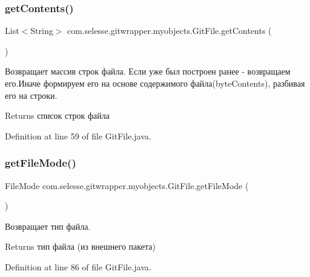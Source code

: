\subsubsection{\texorpdfstring{get\+Contents()}{getContents()}}
{\footnotesize\ttfamily List$<$String$>$ com.\+selesse.\+gitwrapper.\+myobjects.\+Git\+File.\+get\+Contents (\begin{DoxyParamCaption}{ }\end{DoxyParamCaption})}

Возвращает массив строк файла. Если уже был построен ранее -\/ возвращаем его.\+Иначе формируем его на основе содержимого файла(byte\+Contents), разбивая его на строки.

\begin{DoxyReturn}{Returns}
список строк файла 
\end{DoxyReturn}


Definition at line 59 of file Git\+File.\+java.

\mbox{\label{classcom_1_1selesse_1_1gitwrapper_1_1myobjects_1_1_git_file_ae8b6e352a81657771f17c92bb80b98b3}} 
\subsubsection{\texorpdfstring{get\+File\+Mode()}{getFileMode()}}
{\footnotesize\ttfamily File\+Mode com.\+selesse.\+gitwrapper.\+myobjects.\+Git\+File.\+get\+File\+Mode (\begin{DoxyParamCaption}{ }\end{DoxyParamCaption})}

Возвращает тип файла.

\begin{DoxyReturn}{Returns}
тип файла (из внешнего пакета) 
\end{DoxyReturn}


Definition at line 86 of file Git\+File.\+java.

\mbox{\label{classcom_1_1selesse_1_1gitwrapper_1_1myobjects_1_1_git_file_a8d9ecf33f1bdbceec250adbdca2bf609}} 
